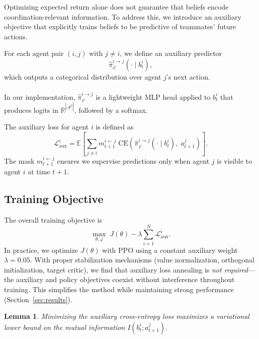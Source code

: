 \documentclass{article}
\theoremstyle{plain}
\newtheorem{lemma}[theorem]{Lemma}
\theoremstyle{definition}
\theoremstyle{remark}
\begin{document}
Optimizing expected return alone does not guarantee that beliefs encode coordination-relevant information. To address this, we introduce an auxiliary objective that explicitly trains beliefs to be predictive of teammates’ future actions.

For each agent pair $(i,j)$ with $j \neq i$, we define an auxiliary predictor
\begin{equation}
\hat{\pi}_\varphi^{i \rightarrow j}(\cdot \mid b_t^i),
\end{equation}
which outputs a categorical distribution over agent $j$'s next action.

\paragraph{}
In our implementation, $\hat{\pi}_\varphi^{i\rightarrow j}$ is a lightweight MLP head applied to $b_t^i$ that produces logits in $\mathbb{R}^{|\mathcal{A}^j|}$, followed by a softmax.

The auxiliary loss for agent $i$ is defined as
\begin{equation}
\mathcal{L}_{\mathrm{aux}}^i
=
\mathbb{E}\left[
\sum_{j \neq i}
m_{t+1}^{i \leftarrow j}
\;
\mathrm{CE}\!\left(
\hat{\pi}_\varphi^{i \rightarrow j}(\cdot \mid b_t^i),
\;
a_{t+1}^j
\right)
\right].
\end{equation}
The mask $m_{t+1}^{i\leftarrow j}$ ensures we supervise predictions only when agent $j$ is visible to agent $i$ at time $t{+}1$.

\subsection{Training Objective}

The overall training objective is
\begin{equation}
\max_{\theta,\varphi}
\;
J(\theta)
-
\lambda
\sum_{i=1}^N
\mathcal{L}_{\mathrm{aux}}^i.
\end{equation}
In practice, we optimize $J(\theta)$ with PPO using a constant auxiliary weight $\lambda = 0.05$. With proper stabilization mechanisms (value normalization, orthogonal initialization, target critic), we find that auxiliary loss annealing is \emph{not required}---the auxiliary and policy objectives coexist without interference throughout training. This simplifies the method while maintaining strong performance (Section~\ref{sec:results}).

\begin{lemma}
Minimizing the auxiliary cross-entropy loss maximizes a variational lower bound on the mutual information $I(b_t^i; a_{t+1}^j).$
\end{lemma}
\end{document}
